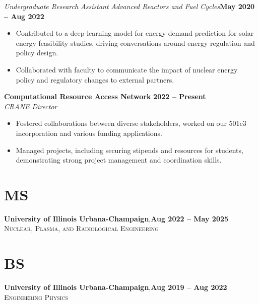 \documentclass[margin,line]{resume}
\begin{document}
\begin{resume}
    \textsl{Undergraduate Research Assistant} \textsl{Advanced Reactors and Fuel Cycles}\hfill \textbf{May 2020 -- Aug 2022}\\
    \begin{itemize}
        \item Contributed to a deep-learning model for energy demand prediction for solar energy feasibility studies, driving conversations around energy regulation and policy design.
        \item Collaborated with faculty to communicate the impact of nuclear energy policy and regulatory changes to external partners.
    \end{itemize}

    \textbf{Computational Resource Access Network} \hfill \textbf{2022 -- Present} \\
    \textsl{CRANE Director} \\
    \begin{itemize}
        \item Fostered collaborations between diverse stakeholders, worked on our 501c3 incorporation and various funding applications.
        \item Managed projects, including securing stipends and resources for students, demonstrating strong project management and coordination skills.
    \end{itemize}

    \section{\mysidestyle MS}
    \textbf{University of Illinois Urbana-Champaign},\hfill\textbf{Aug 2022 -- May 2025}\\
    \textsc{Nuclear, Plasma, and Radiological Engineering}\\
    \vspace{-5.5mm}
    \section{\mysidestyle BS}
    \textbf{University of Illinois Urbana-Champaign},\hfill\textbf{Aug 2019 -- Aug 2022}\\%
    \textsc{Engineering Physics}\\
    \vspace{-5mm}


\end{resume}
\end{document}
